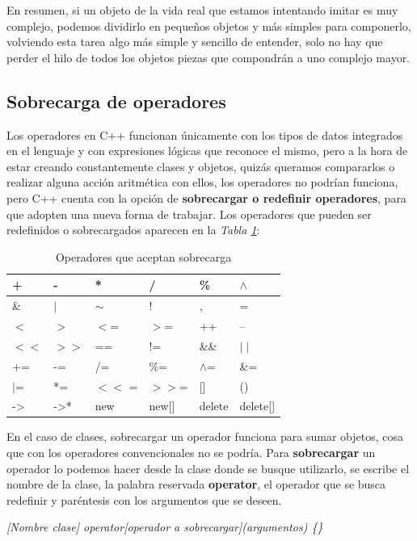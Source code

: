 En resumen, si un objeto de la vida real que estamos intentando imitar es muy complejo, podemos dividirlo en pequeños objetos y más simples para componerlo, volviendo esta tarea algo más simple y sencillo de entender, solo no hay que perder el hilo de todos los objetos piezas que compondrán a uno complejo mayor.


\subsection{Sobrecarga de operadores}
\hspace{0.55cm}Los operadores en C++ funcionan únicamente con los tipos de datos integrados en el lenguaje y con expresiones lógicas que reconoce el mismo, pero a la hora de estar creando constantemente clases y objetos, quizás queramos compararlos o realizar alguna acción aritmética con ellos, los operadores no podrían funciona, pero C++ cuenta con la opción de \textbf{sobrecargar o redefinir operadores}, para que adopten una nueva forma de trabajar. Los operadores que pueden ser redefinidos o sobrecargados aparecen en la \textit{Tabla \ref{tab: 14}}:
\begin{table}[H]
    \begin{center}
        \caption{Operadores que aceptan sobrecarga}
        \label{tab: 14}
        \begin{tabular}{|l|l|l|l|l|l|}
            \hline
            +		&	-		&	*		&	/		&	\%			&	$\wedge$ \\
            \hline
            \&		&	$\mid$	&	$\sim$	&	!		&	,			&	= \\
            \hline
            $<$		&	$>$		&	$<$=		&	$>$=		&	++			&	-- \\
            \hline
            $<<$		&	$>>$		&	==		&	!=		&	\&\&			&	$\mid\mid$ \\
            \hline
            +=		&	-=		&	/=		&	\%=		&	$\wedge$=	&	\&= \\
            \hline
            $\mid$=	&	*=		&	$<<$	=	&	$>>$=	&	[]			&	() \\
            \hline
            ->		&	->*		&	new		&	new[]	&	delete		&	delete[] \\
            \hline
        \end{tabular}
    \end{center}
\end{table}

En el caso de clases, sobrecargar un operador funciona para sumar objetos, cosa que con los operadores convencionales no se podría. Para \textbf{sobrecargar} un operador lo podemos hacer desde la clase donde se busque utilizarlo, se escribe el nombre de la clase, la palabra reservada \textbf{operator}, el operador que se busca redefinir y paréntesis con los argumentos que se deseen.
\begin{center}
	\textit{[Nombre clase] operator[operador a sobrecargar](argumentos) \{\}}
\end{center}

